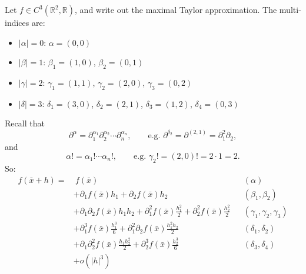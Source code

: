 \begin{example}
\label{ex:taylor_maximal_expansion}
Let $f \in C^3(\mathbb{R}^2,\mathbb{R})$, and write out the maximal Taylor approximation.
The multi-indices are:
\begin{itemize}
  \item $|\alpha| = 0$: $\alpha = (0,0)$
  \item $|\beta| = 1$: $\beta_1 = (1,0)$, $\beta_2 = (0,1)$
  \item $|\gamma| = 2$: $\gamma_1 = (1,1)$, $\gamma_2 = (2,0)$, $\gamma_3 = (0,2)$
  \item $|\delta| = 3$: $\delta_1 = (3,0)$, $\delta_2 = (2,1)$, $\delta_3 = (1,2)$, $\delta_4 = (0,3)$
\end{itemize}
Recall that
\[\partial^\alpha = \partial_1^{\alpha_1}\partial_2^{\alpha_2}\cdots\partial_n^{\alpha_n}, \qquad \text{e.g.\ } \partial^{\delta_2} = \partial^{(2,1)} = \partial_1^2\partial_2,\]
and
\[\alpha! = \alpha_1!\cdots\alpha_n!, \qquad \text{e.g.\ } \gamma_2! = (2,0)! = 2\cdot 1 = 2.\]
So:
\[
\begin{aligned}
f(\bar x + h) = &\ f(\bar x) && (\alpha) \\
&+ \partial_1 f(\bar x)h_1 + \partial_2 f(\bar x)h_2 && (\beta_1, \beta_2)\\
&+ \partial_1\partial_2 f(\bar x)h_1h_2 + \partial_1^2 f(\bar x)\frac{h_1^2}{2} + \partial_2^2 f(\bar x)\frac{h_2^2}{2} && (\gamma_1, \gamma_2, \gamma_3)\\
&+ \partial_1^3 f(\bar x)\frac{h_1^3}{6} + \partial_1^2\partial_2 f(\bar x)\frac{h_1^2h_2}{2} && (\delta_1, \delta_2)\\
&+ \partial_1\partial_2^2 f(\bar x)\frac{h_1h_2^2}{2} + \partial_2^3 f(\bar x)\frac{h_2^3}{6} && (\delta_3, \delta_4)\\
&+ o(|h|^3)
\end{aligned}
\]
\end{example}

